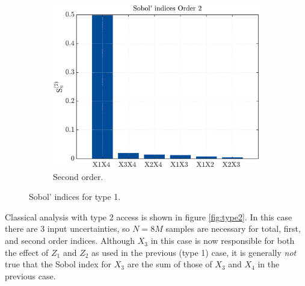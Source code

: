 \documentclass{elsarticle}
\begin{document}
\begin{figure}[hbtp]
\begin{subfigure}[b]{.49\textwidth}
	\centering
	\includegraphics[width=\textwidth]{figures/second_type1.pdf}
	\caption{Second order.\label{fig:second_type1}}
	\end{subfigure}
	\caption{Sobol' indices for type 1.\label{fig:type1}}
\end{figure}

Classical analysis with type 2 access is shown in figure \ref{fig:type2}. In this case there are 3 input uncertainties, so $N=8M$ samples are necessary for total, first, and second order indices. Although $X_{3}$ in this case is now responsible for both the effect of $Z_{1}$ and $Z_{2}$ as used in the previous (type 1) case, it is generally \textit{not} true that the Sobol index for $X_{3}$ are the sum of those of $X_{3}$ and $X_{4}$ in the previous case.
\end{document}
